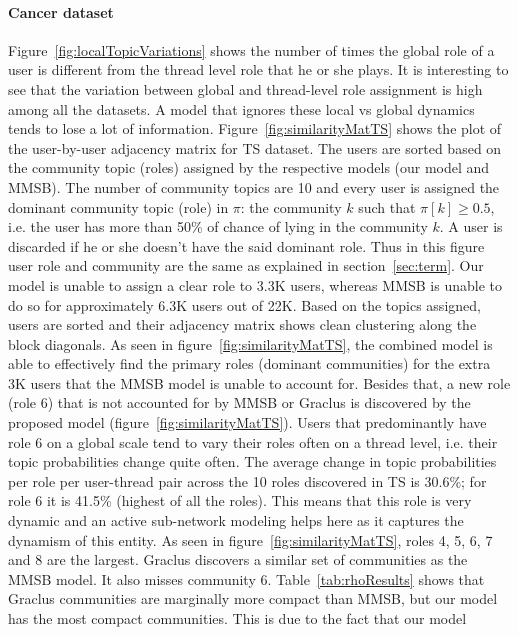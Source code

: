 \documentclass{sig-alternate}
\begin{document}
\paragraph{Cancer dataset}
Figure~\ref{fig:localTopicVariations} shows the number of times the global role
of a user is different from the thread level role that he or she plays. It is 
interesting to see that the variation between global and thread-level role
assignment is high among all the datasets. A model that ignores these local vs
global dynamics tends to lose a lot of information.
Figure~\ref{fig:similarityMatTS} shows the plot of the user-by-user adjacency 
matrix for TS dataset. The users are sorted based on the community topic
(roles) assigned by the respective models (our model and MMSB). The number of
community topics are 10 and every user is assigned the dominant
community topic (role) in $\pi$: the community $k$ such that $\pi[k]\geq0.5$, 
i.e. the user has more than 50\% of chance of lying in the community $k$. A user 
is discarded if he or she
doesn't have the said dominant role. Thus in this figure user role and community are the same
as explained in section~\ref{sec:term}.
Our model is unable to assign a clear 
role to 3.3K users, whereas
MMSB is unable to do so for approximately 6.3K users out of 22K. Based on the topics assigned,
users are sorted and their adjacency matrix shows clean clustering along the
block diagonals.
As seen in figure~\ref{fig:similarityMatTS}, 
the combined model is able to effectively find the
primary roles (dominant communities) for the extra 3K users that the MMSB model is
unable to account for. Besides that, a new role (role 6) that is not accounted for by
MMSB or Graclus is discovered by the proposed model (figure~\ref{fig:similarityMatTS}).
Users that predominantly have role 6 on a global scale tend to vary their roles
often on a thread level, i.e. their topic probabilities change quite often. The
average change in topic probabilities per role per user-thread pair across the
10 roles discovered in TS is 30.6\%; for role 6 it is 41.5\% (highest of all the roles). 
This means
that this role is very dynamic and an active sub-network modeling helps here as 
it captures the
dynamism of this entity. As seen in figure~\ref{fig:similarityMatTS}, roles
4, 5, 6, 7 and 8 are the largest. 
Graclus discovers a similar set of communities as the MMSB model. It also misses
community 6. Table~\ref{tab:rhoResults} shows that Graclus communities 
are marginally more compact than MMSB, but our model has the most compact 
communities. This is due to the fact that our model 
\end{document}
